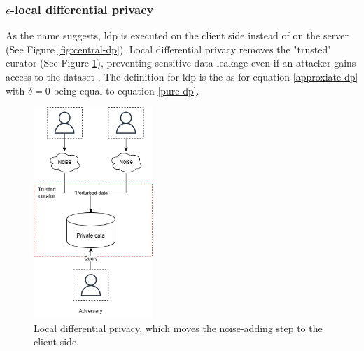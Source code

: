 \subsubsection{$\epsilon$-local differential privacy}
As the name suggests, \gls{ldp} is executed on the client side instead of on the server (See Figure \ref{fig:central-dp}).
Local differential privacy removes the "trusted" curator (See Figure \ref{fig:local-dp}), preventing sensitive data leakage even if an attacker gains access to the dataset \citep{del_rey_comprehensive_2020}.
The definition for \gls{ldp} is the as for equation \ref{approxiate-dp} with $\delta = 0$ being equal to equation \ref{pure-dp}.
\begin{figure}[ht]
  \includegraphics[width=0.4\textwidth]{TheorethicalFramework/Differential privacy/master-thesis-Pagina-8.png}
  \caption{Local differential privacy, which moves the noise-adding step to the client-side.}
  \label{fig:local-dp}
\end{figure}

